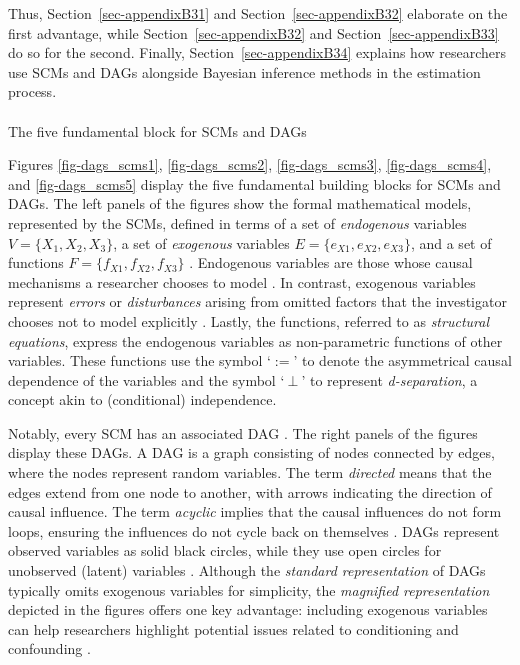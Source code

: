\documentclass[
  authoryear,
  review,
  1p]{elsarticle}
\makeatletter
\let\oldparagraph\paragraph
\renewcommand{\paragraph}{
    \@ifstar
      \xxxParagraphStar
      \xxxParagraphNoStar
  }
\newcommand{\xxxParagraphStar}[1]{\oldparagraph*{#1}\mbox{}}
\newcommand{\xxxParagraphNoStar}[1]{\oldparagraph{#1}\mbox{}}
\makeatother
\begin{document}
Thus, Section~\ref{sec-appendixB31} and Section~\ref{sec-appendixB32}
elaborate on the first advantage, while Section~\ref{sec-appendixB32}
and Section~\ref{sec-appendixB33} do so for the second. Finally,
Section~\ref{sec-appendixB34} explains how researchers use SCMs and DAGs
alongside Bayesian inference methods in the estimation process.

\paragraph{The five fundamental block for SCMs and
DAGs}\label{sec-appendixB31}

Figures \ref{fig-dags_scms1}, \ref{fig-dags_scms2},
\ref{fig-dags_scms3}, \ref{fig-dags_scms4}, and \ref{fig-dags_scms5}
display the five fundamental building blocks for SCMs and DAGs. The left
panels of the figures show the formal mathematical models, represented
by the SCMs, defined in terms of a set of \emph{endogenous} variables
\(V=\{X_{1},X_{2},X_{3}\}\), a set of \emph{exogenous} variables
\(E=\{e_{X1},e_{X2},e_{X3}\}\), and a set of functions
\(F=\{f_{X1},f_{X2},f_{X3}\}\) \citep{Pearl_2009, Cinelli_et_al_2020}.
Endogenous variables are those whose causal mechanisms a researcher
chooses to model \citep{Neal_2020}. In contrast, exogenous variables
represent \emph{errors} or \emph{disturbances} arising from omitted
factors that the investigator chooses not to model explicitly
\citep[pp.~27,68]{Pearl_2009}. Lastly, the functions, referred to as
\emph{structural equations}, express the endogenous variables as
non-parametric functions of other variables. These functions use the
symbol `\(:=\)' to denote the asymmetrical causal dependence of the
variables and the symbol `\(\:\bot\:\)' to represent
\emph{d-separation}, a concept akin to (conditional) independence.

Notably, every SCM has an associated DAG
\citep{Pearl_et_al_2016, Cinelli_et_al_2020}. The right panels of the
figures display these DAGs. A DAG is a graph consisting of nodes
connected by edges, where the nodes represent random variables. The term
\emph{directed} means that the edges extend from one node to another,
with arrows indicating the direction of causal influence. The term
\emph{acyclic} implies that the causal influences do not form loops,
ensuring the influences do not cycle back on themselves
\citep{McElreath_2020}. DAGs represent observed variables as solid black
circles, while they use open circles for unobserved (latent) variables
\citep{Morgan_et_al_2014}. Although the \emph{standard representation}
of DAGs typically omits exogenous variables for simplicity, the
\emph{magnified representation} depicted in the figures offers one key
advantage: including exogenous variables can help researchers highlight
potential issues related to conditioning and confounding
\citep{Cinelli_et_al_2020}.
\end{document}
